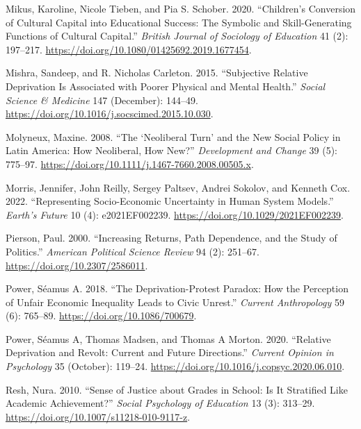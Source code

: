 \documentclass[
  letterpaper,
  DIV=11,
  numbers=noendperiod]{scrartcl}
\newlength{\cslhangindent}
\newlength{\cslentryspacingunit} %
\newenvironment{CSLReferences}[2] %
 {%
  \setlength{\parindent}{0pt}
  \ifodd #1
  \let\oldpar\par
  \def\par{\hangindent=\cslhangindent\oldpar}
  \fi
  \setlength{\parskip}{#2\cslentryspacingunit}
 }%
 {}
\begin{document}
\begin{CSLReferences}{1}{0}
\leavevmode{}%
Mikus, Karoline, Nicole Tieben, and Pia S. Schober. 2020. {``Children's
Conversion of Cultural Capital into Educational Success: The Symbolic
and Skill-Generating Functions of Cultural Capital.''} \emph{British
Journal of Sociology of Education} 41 (2): 197--217.
\url{https://doi.org/10.1080/01425692.2019.1677454}.

\leavevmode{}%
Mishra, Sandeep, and R. Nicholas Carleton. 2015. {``Subjective Relative
Deprivation Is Associated with Poorer Physical and Mental Health.''}
\emph{Social Science \& Medicine} 147 (December): 144--49.
\url{https://doi.org/10.1016/j.socscimed.2015.10.030}.

\leavevmode{}%
Molyneux, Maxine. 2008. {``The {`{Neoliberal Turn}'} and the {New Social
Policy} in {Latin America}: {How Neoliberal}, {How New}?''}
\emph{Development and Change} 39 (5): 775--97.
\url{https://doi.org/10.1111/j.1467-7660.2008.00505.x}.

\leavevmode{}%
Morris, Jennifer, John Reilly, Sergey Paltsev, Andrei Sokolov, and
Kenneth Cox. 2022. {``Representing {Socio}-{Economic Uncertainty} in
{Human System Models}.''} \emph{Earth's Future} 10 (4): e2021EF002239.
\url{https://doi.org/10.1029/2021EF002239}.

\leavevmode{}%
Pierson, Paul. 2000. {``Increasing {Returns}, {Path Dependence}, and the
{Study} of {Politics}.''} \emph{American Political Science Review} 94
(2): 251--67. \url{https://doi.org/10.2307/2586011}.

\leavevmode{}%
Power, Séamus A. 2018. {``The {Deprivation-Protest Paradox}: {How} the
{Perception} of {Unfair Economic Inequality Leads} to {Civic Unrest}.''}
\emph{Current Anthropology} 59 (6): 765--89.
\url{https://doi.org/10.1086/700679}.

\leavevmode{}%
Power, Séamus A, Thomas Madsen, and Thomas A Morton. 2020. {``Relative
Deprivation and Revolt: Current and Future Directions.''} \emph{Current
Opinion in Psychology} 35 (October): 119--24.
\url{https://doi.org/10.1016/j.copsyc.2020.06.010}.

\leavevmode{}%
Resh, Nura. 2010. {``Sense of Justice about Grades in School: Is It
Stratified Like Academic Achievement?''} \emph{Social Psychology of
Education} 13 (3): 313--29.
\url{https://doi.org/10.1007/s11218-010-9117-z}.


\end{CSLReferences}
\end{document}
